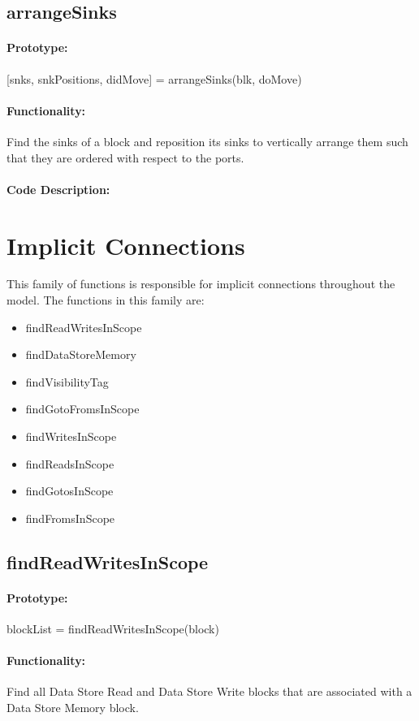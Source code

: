 \documentclass[12pt,letterpaper]{report}
\begin{document}
\subsection{arrangeSinks}
\paragraph{Prototype:} [snks, snkPositions, didMove] = arrangeSinks(blk, doMove)
\paragraph{Functionality:} Find the sinks of a block and reposition its sinks to vertically arrange them such that they are ordered with respect to the ports.
\paragraph{Code Description:}

\section{Implicit Connections}
\par This family of functions is responsible for implicit connections throughout the model. The functions in this family are:
\begin{itemize}
	\item findReadWritesInScope
	\item findDataStoreMemory
	\item findVisibilityTag
	\item findGotoFromsInScope
	\item findWritesInScope
	\item findReadsInScope
	\item findGotosInScope
	\item findFromsInScope
\end{itemize}

\subsection{findReadWritesInScope}
\paragraph{Prototype:} blockList = findReadWritesInScope(block)
\paragraph{Functionality:} Find all Data Store Read and Data Store Write blocks that are associated with a Data Store Memory block.
\end{document}
